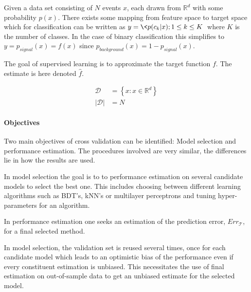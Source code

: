 
Given a data set consisting of $N$ events $x$, each drawn from $\mathbb{R}^{d}$ with some probability $p(x)$. There exists some mapping from feature space to target space which for classification can be written as $y = \<p(c_k | x); 1 \leq k \leq K\>$ where $K$ is the number of classes. In the case of binary classification this simplifies to $y = p_{signal}(x) = f(x)$ since $p_{background}(x) = 1 - p_{signal}(x)$.

The goal of supervised learning is to approximate the target function $f$. The estimate is here denoted $\hat{f}$.

\begin{align}
\mathcal{D} &= \left\{x : x \in \mathbb{R}^{d}\right\} \\
|\mathcal{D}| &= N
\end{align}

\paragraph{Objectives}
Two main objectives of cross validation can be identified: Model selection and performance estimation. The procedures involved are very similar, the differences lie in how the results are used.

In model selection the goal is to to performance estimation on several candidate models to select the best one. This includes choosing between different learning algorithms such as BDT's, kNN's or multilayer perceptrons and tuning hyper-parameters for an algorithm.

In performance estimation one seeks an estimation of the prediction error, $Err_{\mathcal{T}}$, for a final selected method.

In model selection, the validation set is reused several times, once for each candidate model which leads to an optimistic bias of the performance even if every constituent estimation is unbiased.  This necessitates the use of final estimation on out-of-sample data to get an unbiased estimate for the selected model.


